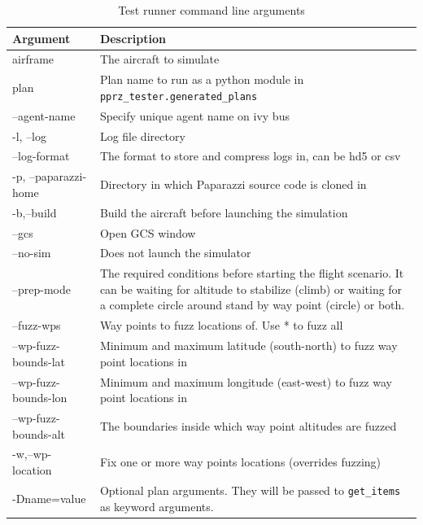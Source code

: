 \begin{table}[]
    \centering
\begin{longtable}{lp{}}
\toprule
\textbf{Argument}   & \textbf{Description}\\ \hline
\endhead
%
\hline
\endfoot
%
\endlastfoot
airframe              &  The aircraft to simulate \\
plan                  &  Plan name to run as a python module in \verb|pprz_tester.generated_plans| \\
--agent-name          &  Specify unique agent name on ivy bus \\
-l, --log             &  Log file directory \\
--log-format          &  The format to store and compress logs in, can be hd5 or csv \\ \hline
-p, --paparazzi-home  &  Directory in which Paparazzi source code is cloned in \\
-b,--build            &  Build the aircraft before launching the simulation \\
--gcs                 &  Open GCS window \\
--no-sim              &  Does not launch the simulator \\
--prep-mode           &  The required conditions before starting the flight scenario. It can be waiting for altitude to stabilize (climb) or waiting for a complete circle around stand by way point (circle) or both. \\ \hline
--fuzz-wps            &  Way points to fuzz locations of. Use * to fuzz all \\
--wp-fuzz-bounds-lat  &  Minimum and maximum latitude (south-north) to fuzz way point locations in \\
--wp-fuzz-bounds-lon  &  Minimum and maximum longitude (east-west) to fuzz way point locations in \\
--wp-fuzz-bounds-alt  &  The boundaries inside which way point altitudes are fuzzed \\
-w,--wp-location      &  Fix one or more way points locations (overrides fuzzing) \\ \hline
-Dname=value          &  Optional plan arguments. They will be passed to \verb|get_items| as keyword arguments. \\ \bottomrule
\end{longtable}
\caption{Test runner command line arguments}
\label{tab:test_runner_commandline_args}
\end{table}



